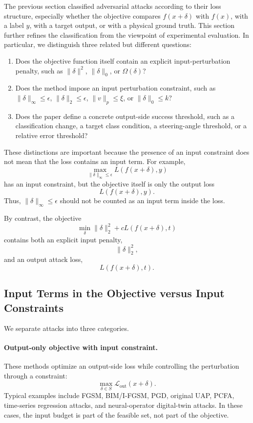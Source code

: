 \documentclass{article}
\begin{document}
The previous section classified adversarial attacks according to their loss structure, especially whether the objective compares \(f(x+\delta)\) with \(f(x)\), with a label \(y\), with a target output, or with a physical ground truth. This section further refines the classification from the viewpoint of experimental evaluation. In particular, we distinguish three related but different questions:
\begin{enumerate}
    \item Does the objective function itself contain an explicit input-perturbation penalty, such as \(\|\delta\|^2\), \(\|\delta\|_0\), or \(\Omega(\delta)\)?
    \item Does the method impose an input perturbation constraint, such as \(\|\delta\|_\infty \leq \epsilon\), \(\|\delta\|_2\leq \epsilon\), \(\|v\|_p\leq \xi\), or \(\|\delta\|_0\leq k\)?
    \item Does the paper define a concrete output-side success threshold, such as a classification change, a target class condition, a steering-angle threshold, or a relative error threshold?
\end{enumerate}

These distinctions are important because the presence of an input constraint does not mean that the loss contains an input term. For example,
\[
    \max_{\|\delta\|_\infty\leq \epsilon}
    L(f(x+\delta),y)
\]
has an input constraint, but the objective itself is only the output loss
\[
    L(f(x+\delta),y).
\]
Thus, \(\|\delta\|_\infty\leq \epsilon\) should not be counted as an input term inside the loss.

By contrast, the objective
\[
    \min_\delta
    \|\delta\|_2^2
    +
    cL(f(x+\delta),t)
\]
contains both an explicit input penalty,
\[
    \|\delta\|_2^2,
\]
and an output attack loss,
\[
    L(f(x+\delta),t).
\]

\subsection{Input Terms in the Objective versus Input Constraints}

We separate attacks into three categories.

\paragraph{Output-only objective with input constraint.}
These methods optimize an output-side loss while controlling the perturbation through a constraint:
\[
    \max_{\delta\in S}
    \mathcal{L}_{\mathrm{out}}(x+\delta).
\]
Typical examples include FGSM, BIM/I-FGSM, PGD, original UAP, PCFA, time-series regression attacks, and neural-operator digital-twin attacks. In these cases, the input budget is part of the feasible set, not part of the objective.
\end{document}
